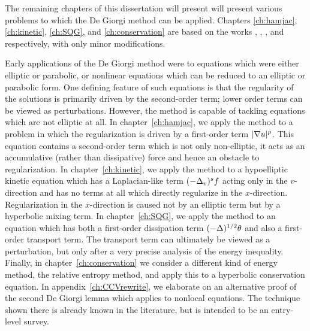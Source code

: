 The remaining chapters of this dissertation will present will present various problems to which the De Giorgi method can be applied.  Chapters \ref{ch:hamjac}, \ref{ch:kinetic}, \ref{ch:SQG}, and \ref{ch:conservation} are based on the works \cite{StVa.hamjac}, \cite{St.hypo}, \cite{StVa.sqg}, and \cite{St.shocks} respectively, with only minor modifications.  

Early applications of the De Giorgi method were to equations which were either elliptic or parabolic, or nonlinear equations which can be reduced to an elliptic or parabolic form.  One defining feature of such equations is that the regularity of the solutions is primarily driven by the second-order term; lower order terms can be viewed as perturbations.  However, the method is capable of tackling equations which are not elliptic at all.  In chapter~\ref{ch:hamjac}, we apply the method to a problem in which the regularization is driven by a first-order term $|\nabla u|^p$.  This equation contains a second-order term which is not only non-elliptic, it acts as an accumulative (rather than dissipative) force and hence an obstacle to regularization.  In chapter~\ref{ch:kinetic}, we apply the method to a hypoelliptic kinetic equation which has a Laplacian-like term $(-\Delta_v)^s f$ acting only in the $v$-direction and has no terms at all which directly regularize in the $x$-direction.  Regularization in the $x$-direction is caused not by an elliptic term but by a hyperbolic mixing term.  In chapter~\ref{ch:SQG}, we apply the method to an equation which has both a first-order dissipation term $(-\Delta)^{1/2} \theta$ and also a first-order transport term.  The transport term can ultimately be viewed as a perturbation, but only after a very precise analysis of the energy inequality.  Finally, in chapter~\ref{ch:conservation} we consider a different kind of energy method, the relative entropy method, and apply this to a hyperbolic conservation equation.  In appendix~\ref{ch:CCVrewrite}, we elaborate on an alternative proof of the second De Giorgi lemma which applies to nonlocal equations.  The technique shown there is already known in the literature, but is intended to be an entry-level survey.  


